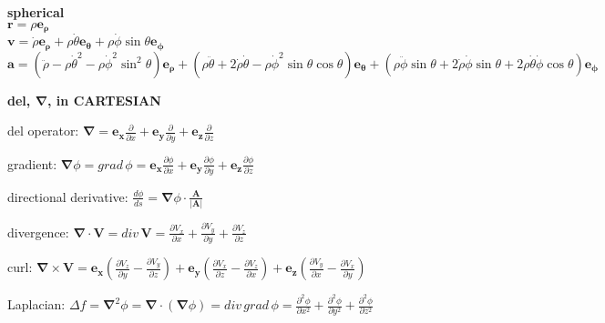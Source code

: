 \documentclass[letterpaper,landscape,10pt]{article}
\newenvironment{mydescription}
{\begin{description}
	\setlength{\itemsep}{0pt}
	\setlength{\parskip}{0pt}
	\setlength{\parsep}{-1pt}}
{\end{description}}
\begin{document}
{\begin{multicols}{3}
\begin{mydescription}
	\item[\textbf{spherical}] \ \\
		$\bm{\bm{r}} = \rho \bm{\bm{e_\rho}}$\\
		$\bm{\bm v} = \dot \rho \bm{\bm{e_\rho}} + \rho\dot \theta \bm{\bm{e_\theta}} +
			\rho \dot\phi\sin\theta\bm{\bm{e_\phi}}$\\
		$\bm{\bm{a}} = \left( \ddot \rho -
			\rho\dot\theta^2-\rho\dot\phi^2\sin^2\theta\right)\bm{\bm{e_\rho}} +
			\left(\rho\ddot\theta+2\dot \rho \dot\theta -
			\rho\dot\phi^2\sin\theta\cos\theta\right)\bm{\bm{e_\theta}} + \left(
			\rho\ddot\phi\sin\theta+2\dot \rho\dot\phi\sin\theta +
			2\rho\dot\theta\dot\phi\cos\theta\right)\bm{\bm{e_\phi}}$
	\end{mydescription}
	\begin{center}\textbf{del, $\bm{\nabla}$, in CARTESIAN}\end{center}
		\begin{mydescription}
			\item[del operator:]
				$\bm{\nabla} =
				\bm{e_x} \frac{\partial}{\partial x} +
				\bm{e_y}\frac{\partial}{\partial y} + 
				\bm{e_z}\frac{\partial}{\partial z}$  
			\item[gradient:]
				$\bm{\nabla}\phi =
				grad\,\phi =
				\bm{e_x}\frac{\partial\phi}{\partial x} +
				\bm{e_y}\frac{\partial\phi}{\partial y} +
				\bm{e_z}\frac{\partial\phi}{\partial z}$  
			\item[directional derivative:]
				$\frac{d\phi}{ds} =
					\bm{\nabla}\phi \cdot \frac{\bm{A}}{|\bm{A}|}$  
			\item[divergence:]
				$\bm{\nabla}\cdot\bm{V} =
				div\, \bm{V} =
					\frac{\partial V_x}{\partial x} +
					\frac{\partial V_y}{\partial y} +
					\frac{\partial V_z}{\partial z}$  
			\item[curl:]
				$\bm{\nabla}\times \bm{V} =
				\bm{e_x}\left(\frac{\partial V_z}{\partial y} -
					\frac{\partial V_y}{\partial z}\right) +
					\bm{e_y} \left( \frac{\partial V_x}{\partial z} -
					\frac{\partial V_z}{\partial x}\right) +
					\bm{e_z} \left( \frac{\partial V_y}{\partial x} -
					\frac{\partial V_x}{\partial y} \right) $  
			\item[Laplacian:]
				$\Delta f = \bm{\nabla}^2\phi =
				\bm{\nabla} \cdot (\bm{\nabla}\phi) = div\, grad\, \phi =
					\frac{\partial^2 \phi}{\partial x^2} +
					\frac{\partial^2 \phi}{\partial y^2} +
					\frac{\partial^2 \phi}{\partial z^2}$ 
		\end{mydescription}


\end{multicols}}
\end{document}
